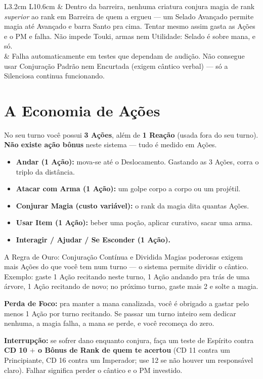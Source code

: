 \begin{tabelalivro}{L{3.2cm} L{10.6cm}}{}
 & Dentro da barreira, nenhuma criatura conjura magia de rank \emph{superior} ao rank em Barreira de quem a ergueu --- um Selado Avançado permite magia até Avançado e barra Santo pra cima. Tentar mesmo assim gasta as Ações e o PM e falha. Não impede Touki, armas nem Utilidade: Selado é sobre mana, e só. \\
 & Falha automaticamente em testes que dependam de audição. Não consegue usar Conjuração Padrão nem Encurtada (exigem cântico verbal) --- só a Silenciosa continua funcionando. \\
\end{tabelalivro}

\section{A Economia de Ações}

No seu turno você possui \textbf{3 Ações}, além de \textbf{1 Reação} (usada fora do seu
turno). \textbf{Não existe ação bônus} neste sistema --- tudo é medido em Ações.

\begin{itemize}
    \item \textbf{Andar (1 Ação):} mova-se até o Deslocamento. Gastando as 3 Ações, corra o
          triplo da distância.
    \item \textbf{Atacar com Arma (1 Ação):} um golpe corpo a corpo ou um projétil.
    \item \textbf{Conjurar Magia (custo variável):} o rank da magia dita quantas Ações.
    \item \textbf{Usar Item (1 Ação):} beber uma poção, aplicar curativo, sacar uma arma.
    \item \textbf{Interagir / Ajudar / Se Esconder (1 Ação).}
\end{itemize}

\begin{nota}{A Regra de Ouro: Conjuração Contínua e Dividida}
    Magias poderosas exigem mais Ações do que você tem num turno --- o sistema permite
    dividir o cântico. Exemplo: gaste 1 Ação recitando neste turno, 1 Ação andando pra trás
    de uma árvore, 1 Ação recitando de novo; no próximo turno, gaste mais 2 e solte a magia.

    \medskip
    \textbf{Perda de Foco:} pra manter a mana canalizada, você é obrigado a gastar pelo menos
    1 Ação por turno recitando. Se passar um turno inteiro sem dedicar nenhuma, a magia
    falha, a mana se perde, e você recomeça do zero.

    \medskip
    \textbf{Interrupção:} se sofrer dano enquanto conjura, faça um teste de Espírito contra
    \textbf{CD 10 $+$ o Bônus de Rank de quem te acertou} (CD 11 contra um Principiante, CD
    16 contra um Imperador; use 12 se não houver um responsável claro). Falhar significa
    perder o cântico e o PM investido.
\end{nota}

